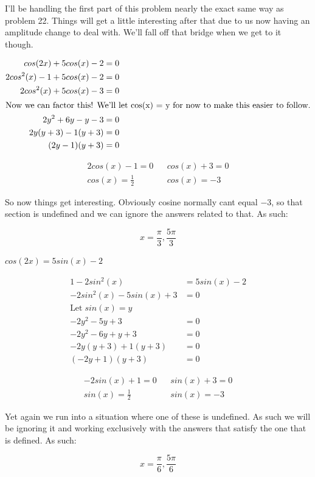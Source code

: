 \documentclass[10pt,letterpaper]{amspset}
\begin{document}
\begin{solution}
    I'll be handling the first part of this problem nearly the exact same way as problem 22. Things will get a little interesting after that due to us now having an amplitude change to deal with. We'll fall off that bridge when we get to it though.
    
    \begin{align}
        cos(2x) + 5cos(x) - 2 &= 0 \\
        2cos^2(x) - 1 + 5cos(x) - 2 &= 0 \\
        2cos^2(x)+ 5cos(x) - 3 &= 0 \\
        \intertext{Now we can factor this! We'll let cos(x) = y for now to make this easier to follow.}
        2y^2 + 6y - y - 3 &= 0 \\
        2y(y+3) - 1(y + 3) &= 0 \\
        (2y - 1)(y + 3) &= 0
    \end{align}
    
    \begin{align}
        2cos(x) - 1 = 0 && cos(x) + 3 = 0 \\
        cos(x) = \frac{1}{2} && cos(x) = - 3
    \end{align}
    
    So now things get interesting. Obviously cosine normally cant equal $-3$, so that section is undefined and we can ignore the answers related to that. As such:
    
    \[\boxed{x = \frac{\pi}{3}, \frac{5\pi}{3}}\]
\end{solution}


\pagebreak


\begin{problem}[26]
    $cos(2x) = 5sin(x) - 2$
\end{problem}

\begin{solution}
    \begin{align}
        1 - 2sin^2(x) &= 5sin(x) - 2 \\
        -2sin^2(x) - 5sin(x) + 3 &= 0 \\[+3mm]
        \text{Let} \; sin(x) = y \\[+3mm]
        -2y^2 - 5y + 3 &= 0 \\
        -2y^2 - 6y + y + 3 &= 0 \\
        -2y(y + 3) + 1(y + 3) &= 0 \\
        (-2y + 1) (y + 3) &= 0
    \end{align}
    
    \begin{align}
        -2sin(x) + 1 = 0 && sin(x) + 3 = 0 \\
        sin(x) = \frac{1}{2} && sin(x) = -3
    \end{align}
    
    Yet again we run into a situation where one of these is undefined. As such we will be ignoring it and working exclusively with the answers that satisfy the one that is defined. As such:
    
    \[\boxed{ x = \frac{\pi}{6}, \frac{5\pi}{6}  }\]
\end{solution}
\end{document}
